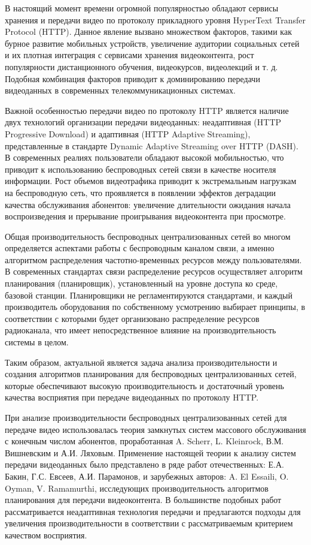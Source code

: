 {\actuality}
В настоящий момент времени огромной популярностью обладают сервисы хранения и передачи видео по протоколу прикладного уровня HyperText Transfer Protocol (HTTP). Данное явление вызвано множеством факторов, такими как бурное развитие мобильных устройств, увеличение аудитории социальных сетей и их плотная интеграция с сервисами хранения видеоконтента, рост популярности дистанционного обучения, видеокурсов, видеолекций и т. д. Подобная комбинация факторов приводит к доминированию передачи видеоданных в современных телекоммуникационных системах.

Важной особенностью передачи видео по протоколу HTTP является наличие двух технологий организации передачи видеоданных: неадаптивная (HTTP Progressive Download) и адаптивная (HTTP Adaptive Streaming), представленные в стандарте Dynamic Adaptive Streaming over HTTP (DASH). В современных реалиях пользователи обладают высокой мобильностью, что приводит к использованию беспроводных сетей связи в качестве носителя информации. Рост объемов видеотрафика приводит к экстремальным нагрузкам на беспроводную сеть, что проявляется в появлении эффектов деградации качества обслуживания абонентов: увеличение длительности ожидания начала воспроизведения и прерывание проигрывания видеоконтента при просмотре.

Общая производительность беспроводных централизованных сетей во многом определяется аспектами работы с беспроводным каналом связи, а именно алгоритмом распределения частотно-временных ресурсов между пользователями. В современных стандартах связи распределение ресурсов осуществляет алгоритм планирования (планировщик), установленный на уровне доступа ко среде, базовой станции. Планировщики не регламентируются стандартами, и каждый производитель оборудования по собственному усмотрению выбирает принципы, в соответствии с которыми будет организовано распределение ресурсов радиоканала, что имеет непосредственное влияние на производительность системы в целом.

Таким образом, актуальной является задача анализа производительности и создания алгоритмов планирования для беспроводных централизованных сетей, которые обеспечивают высокую производительность и достаточный уровень качества восприятия при передаче видеоданных по протоколу HTTP.

При анализе производительности беспроводных централизованных сетей для передаче видео использовалась теория замкнутых систем массового обслуживания с конечным числом абонентов, проработанная A. Scherr, L. Kleinrock, В.М. Вишневским и А.И. Ляховым. Применение настоящей теории к анализу систем передачи видеоданных было представлено в ряде работ отечественных: Е.А. Бакин, Г.С. Евсеев, А.И. Парамонов, и зарубежных авторов: A. El Essaili, O. Oyman, V. Ramamurthi, исследующих производительность алгоритмов планирования для передачи видеоконтента. В большинстве подобных работ рассматривается неадаптивная технология передачи и предлагаются подходы для увеличения производительности в соответствии с рассматриваемым критерием качеством восприятия.

